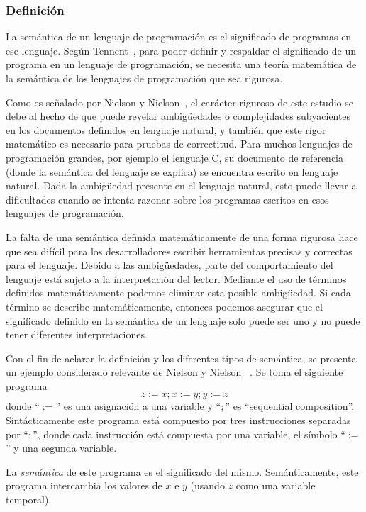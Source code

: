 \subsubsection*{Definición}

La semántica de un lenguaje de programación es el significado de programas en ese lenguaje.
Según Tennent~\cite{tennent}, para poder definir y respaldar el significado de un programa en un lenguaje de programación, se necesita una teoría matemática de la semántica de los lenguajes de programación que sea rigurosa.

Como es señalado por Nielson y Nielson~\cite{nielson}, el carácter riguroso de este estudio se debe al hecho de que puede revelar ambigüedades o complejidades subyacientes en los documentos definidos en lenguaje natural, y también que este rigor matemático es necesario para pruebas de correctitud.
Para muchos lenguajes de programación grandes, por ejemplo el lenguaje C, su documento de referencia (donde la semántica del lenguaje se explica) se encuentra escrito en lenguaje natural.
Dada la ambigüedad presente en el lenguaje natural, esto puede llevar a dificultades cuando se intenta razonar sobre los programas escritos en esos lenguajes de programación.

La falta de una semántica definida matemáticamente de una forma rigurosa hace que sea difícil para los desarrolladores escribir herramientas precisas y correctas para el lenguaje.
Debido a las ambigüedades, parte del comportamiento del lenguaje está sujeto a la interpretación del lector.
Mediante el uso de términos definidos matemáticamente podemos eliminar esta posible ambigüedad.
Si cada término se describe matemáticamente, entonces podemos asegurar que el significado definido en la semántica de un lenguaje solo puede ser uno y no puede tener diferentes interpretaciones.

Con el fin de aclarar la definición y los diferentes tipos de semántica, se presenta un ejemplo considerado relevante de Nielson y Nielson ~\cite{nielson}.
Se toma el siguiente programa
\begin{equation*}
z:=x; x:=y; y:=z
\end{equation*}
donde ``$:=$'' es una asignación a una variable y ``$;$'' es ``sequential composition''.
Sintácticamente este programa está compuesto por tres instrucciones separadas por ``$;$'', donde cada instrucción está compuesta por una variable, el símbolo ``$:=$'' y una segunda variable.

La \textit{semántica} de este programa es el significado del mismo.
Semánticamente, este programa intercambia los valores de $x$ e $y$ (usando $z$ como una variable temporal).

